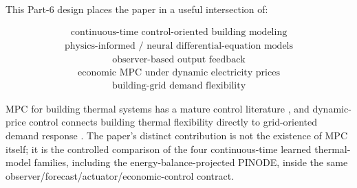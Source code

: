 \documentclass[11pt]{article}
\begin{document}
This Part-6 design places the paper in a useful intersection of:

\begin{align}
\boxed{\text{continuous-time control-oriented building modeling}}
\end{align}
\begin{align}
\boxed{\text{physics-informed / neural differential-equation models}}
\end{align}
\begin{align}
\boxed{\text{observer-based output feedback}}
\end{align}
\begin{align}
\boxed{\text{economic MPC under dynamic electricity prices}}
\end{align}
\begin{align}
\boxed{\text{building-grid demand flexibility}}
\end{align}

MPC for building thermal systems has a mature control literature
\citep{ma2012predictive,afram2014review,killian2016ten,drgona2020all}, and dynamic-price control
connects building thermal flexibility directly to grid-oriented demand response
\citep{avci2013price,amin2020price,zanetti2025flex}.  The paper's distinct contribution is not
the existence of MPC itself; it is the controlled comparison of the four continuous-time learned
thermal-model families, including the energy-balance-projected PINODE, inside the same
observer/forecast/actuator/economic-control contract.



\end{document}
